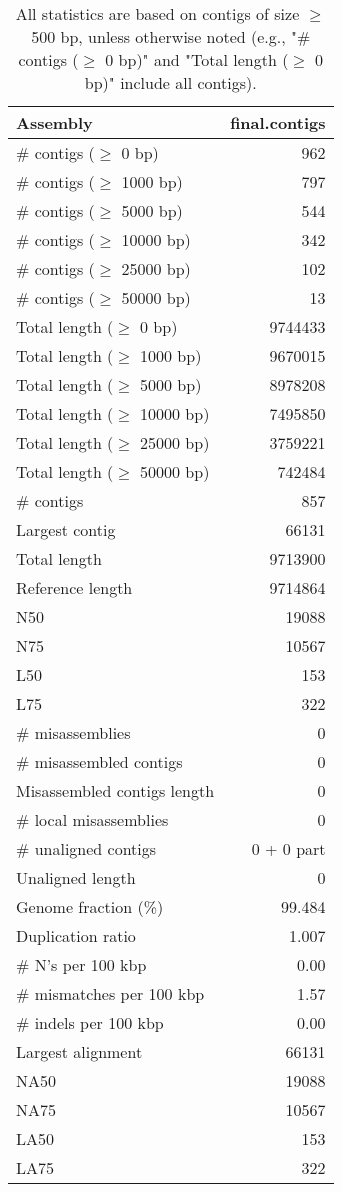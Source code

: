 \documentclass[12pt,a4paper]{article}
\begin{document}
\begin{table}[ht]
\begin{center}
\caption{All statistics are based on contigs of size $\geq$ 500 bp, unless otherwise noted (e.g., "\# contigs ($\geq$ 0 bp)" and "Total length ($\geq$ 0 bp)" include all contigs).}
\begin{tabular}{|l*{1}{|r}|}
\hline
Assembly & final.contigs \\ \hline
\# contigs ($\geq$ 0 bp) & 962 \\ \hline
\# contigs ($\geq$ 1000 bp) & 797 \\ \hline
\# contigs ($\geq$ 5000 bp) & 544 \\ \hline
\# contigs ($\geq$ 10000 bp) & 342 \\ \hline
\# contigs ($\geq$ 25000 bp) & 102 \\ \hline
\# contigs ($\geq$ 50000 bp) & 13 \\ \hline
Total length ($\geq$ 0 bp) & 9744433 \\ \hline
Total length ($\geq$ 1000 bp) & 9670015 \\ \hline
Total length ($\geq$ 5000 bp) & 8978208 \\ \hline
Total length ($\geq$ 10000 bp) & 7495850 \\ \hline
Total length ($\geq$ 25000 bp) & 3759221 \\ \hline
Total length ($\geq$ 50000 bp) & 742484 \\ \hline
\# contigs & 857 \\ \hline
Largest contig & 66131 \\ \hline
Total length & 9713900 \\ \hline
Reference length & 9714864 \\ \hline
N50 & 19088 \\ \hline
N75 & 10567 \\ \hline
L50 & 153 \\ \hline
L75 & 322 \\ \hline
\# misassemblies & 0 \\ \hline
\# misassembled contigs & 0 \\ \hline
Misassembled contigs length & 0 \\ \hline
\# local misassemblies & 0 \\ \hline
\# unaligned contigs & 0 + 0 part \\ \hline
Unaligned length & 0 \\ \hline
Genome fraction (\%) & 99.484 \\ \hline
Duplication ratio & 1.007 \\ \hline
\# N's per 100 kbp & 0.00 \\ \hline
\# mismatches per 100 kbp & 1.57 \\ \hline
\# indels per 100 kbp & 0.00 \\ \hline
Largest alignment & 66131 \\ \hline
NA50 & 19088 \\ \hline
NA75 & 10567 \\ \hline
LA50 & 153 \\ \hline
LA75 & 322 \\ \hline
\end{tabular}
\end{center}
\end{table}
\end{document}
